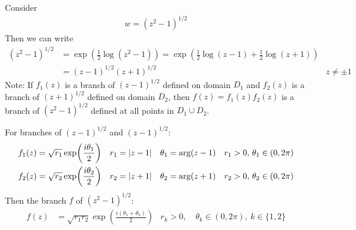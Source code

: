 \documentclass[12pt, english]{book}
\begin{document}
	\begin{example}
		Consider 
		\begin{align*}
			w = (z^2 - 1)^{1/2}
		\end{align*}
		Then we can write
		\begin{align*}
			(z^2 - 1)^{1/2} 
			&= \exp(\frac{1}{2}\log(z^2 - 1)) = \exp(\frac{1}{2}\log(z-1) + \frac{1}{2}\log(z+1)) \\
			&= (z-1)^{1/2} (z+1)^{1/2} & z \neq \pm 1
		\end{align*}
		Note: If \(f_1(z)\) is a branch of \((z-1)^{1/2}\) defined on domain \(D_1\) and \(f_2(z)\) is a branch of \((z+1)^{1/2}\) defined on domain \(D_2\), then \(f(z) = f_1(z) f_2(z)\) is a branch of \((z^2 - 1)^{1/2}\) defined at all points in \(D_1 \cup D_2\).
		
		For branches of \((z-1)^{1/2}\) and \((z-1)^{1/2}\):
		\begin{align*}
			f_1(z) &= \sqrt{r_1} \exp(\frac{i\theta_1}{2})	&
				r_1 &= \abs{z-1} & 
				\theta_1 &= \arg(z-1) &
				r_1>0, &\ \theta_1 \in (0, 2\pi) \\
			f_2(z) &= \sqrt{r_2} \exp(\frac{i\theta_2}{2})	&
				r_2 &= \abs{z+1} & 
				\theta_2 &= \arg(z+1) &
				r_2>0, &\ \theta_2 \in (0, 2\pi)
		\end{align*}
		Then the branch \(f\) of \((z^2 - 1)^{1/2}\):
		\begin{align*}
			f(z) &= \sqrt{r_1 r_2} \exp(\frac{i(\theta_1 + \theta_2)}{2}) &
				r_k > 0, &\ \theta_k \in (0, 2\pi), \ k \in \{1,2\}
		\end{align*}
		
		\begin{figure}[H]
			\centering
\end{figure}
\end{example}
\end{document}

